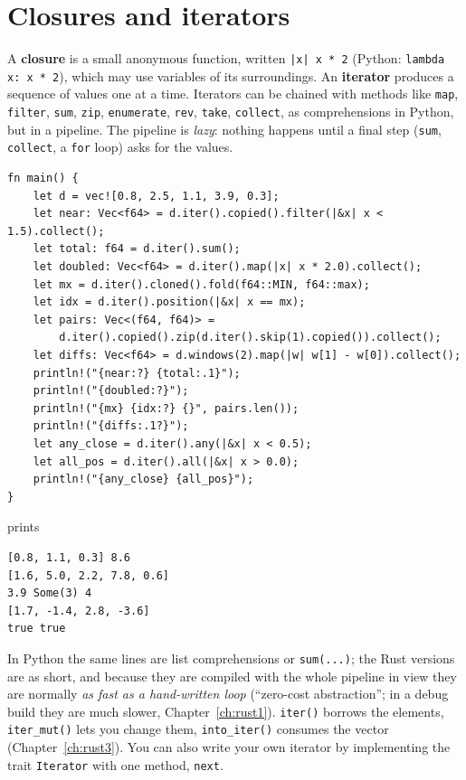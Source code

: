 \section*{Closures and iterators}
A \textbf{closure} is a small anonymous function, written \verb!|x| x * 2! (Python: \verb!lambda x: x * 2!), which may use variables of its surroundings. An \textbf{iterator} produces a sequence of values one at a time. Iterators can be chained with methods like \verb!map!, \verb!filter!, \verb!sum!, \verb!zip!, \verb!enumerate!, \verb!rev!, \verb!take!, \verb!collect!, as comprehensions in Python, but in a pipeline. The pipeline is \emph{lazy}: nothing happens until a final step (\verb!sum!, \verb!collect!, a \verb!for! loop) asks for the values.
\begin{verbatim}
fn main() {
    let d = vec![0.8, 2.5, 1.1, 3.9, 0.3];
    let near: Vec<f64> = d.iter().copied().filter(|&x| x < 1.5).collect();
    let total: f64 = d.iter().sum();
    let doubled: Vec<f64> = d.iter().map(|x| x * 2.0).collect();
    let mx = d.iter().cloned().fold(f64::MIN, f64::max);
    let idx = d.iter().position(|&x| x == mx);
    let pairs: Vec<(f64, f64)> =
        d.iter().copied().zip(d.iter().skip(1).copied()).collect();
    let diffs: Vec<f64> = d.windows(2).map(|w| w[1] - w[0]).collect();
    println!("{near:?} {total:.1}");
    println!("{doubled:?}");
    println!("{mx} {idx:?} {}", pairs.len());
    println!("{diffs:.1?}");
    let any_close = d.iter().any(|&x| x < 0.5);
    let all_pos = d.iter().all(|&x| x > 0.0);
    println!("{any_close} {all_pos}");
}
\end{verbatim}
prints
\begin{verbatim}
[0.8, 1.1, 0.3] 8.6
[1.6, 5.0, 2.2, 7.8, 0.6]
3.9 Some(3) 4
[1.7, -1.4, 2.8, -3.6]
true true
\end{verbatim}
In Python the same lines are list comprehensions or \verb!sum(...)!; the Rust versions are as short, and because they are compiled with the whole pipeline in view they are normally \emph{as fast as a hand-written loop} (``zero-cost abstraction''; in a debug build they are much slower, Chapter~\ref{ch:rust1}). \verb!iter()! borrows the elements, \verb!iter_mut()! lets you change them, \verb!into_iter()! consumes the vector (Chapter~\ref{ch:rust3}). You can also write your own iterator by implementing the trait \verb!Iterator! with one method, \verb!next!.

